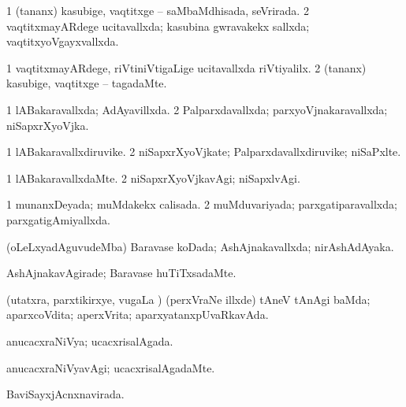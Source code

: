 {{\bentry
{} 
\gl{\gu}
\expl{}
\bmng
\bnum
\num{1} (tananx) kasubige, vaqtitxge -- saMbaMdhisada, seVrirada. 
\num{2} vaqtitxmayARdege ucitavallxda; kasubina gwravakekx sallxda; vaqtitxyoVgayxvallxda. 
\enum
\emng
\eentry

\bentry
{} 
\gl{\kirxvi}
\expl{}
\bmng
\bnum
\num{1} vaqtitxmayARdege, riVtiniVtigaLige ucitavallxda riVtiyalilx. 
\num{2} (tananx) kasubige, vaqtitxge -- tagadaMte. 
\enum
\emng
\eentry

\bentry
{} 
\gl{\gu}
\expl{}
\bmng
\bnum
\num{1} lABakaravallxda; AdAyavillxda. 
\num{2} Palparxdavallxda; parxyoVjnakaravallxda; niSapxrXyoVjka. 
\enum
\emng
\eentry

\bentry
{} 
\gl{\nA}
\expl{}
\bmng
\bnum
\num{1} lABakaravallxdiruvike. 
\num{2} niSapxrXyoVjkate; Palparxdavallxdiruvike; niSaPxlte. 
\enum
\emng
\eentry

\bentry
{} 
\gl{\kirxvi}
\expl{}
\bmng
\bnum
\num{1} lABakaravallxdaMte. 
\num{2} niSapxrXyoVjkavAgi; niSapxlvAgi. 
\enum
\emng
\eentry

\bentry
{} 
\gl{\gu}
\expl{}
\bmng
\bnum
\num{1} munanxDeyada; muMdakekx calisada. 
\num{2} muMduvariyada; parxgatiparavallxda; parxgatigAmiyallxda. 
\enum
\emng
\eentry

\bentry
{} 
\gl{\gu}
\expl{}
\bmng
(oLeLxyadAguvudeMba) Baravase koDada; AshAjnakavallxda; nirAshAdAyaka. 
\emng
\eentry

\bentry
{} 
\gl{\kirxvi}
\expl{}
\bmng
AshAjnakavAgirade; Baravase huTiTxsadaMte. 
\emng
\eentry

\bentry
{} 
\gl{\gu}
\expl{}
\bmng
(utatxra, parxtikirxye, \mo vugaLa \vi) (perxVraNe illxde) tAneV tAnAgi baMda; aparxcoVdita; aperxVrita; aparxyatanxpUvaRkavAda. 
\emng
\eentry

\bentry
{} 
\gl{\gu}
\expl{}
\bmng
anucacxraNiVya; ucacxrisalAgada. 
\emng
\eentry

\bentry
{} 
\gl{\kirxvi}
\expl{}
\bmng
anucacxraNiVyavAgi; ucacxrisalAgadaMte. 
\emng
\eentry

\bentry
{} 
\gl{\gu}
\expl{}
\bmng
BaviSayxjAcnxnavirada. 
\emng
\eentry

}}

